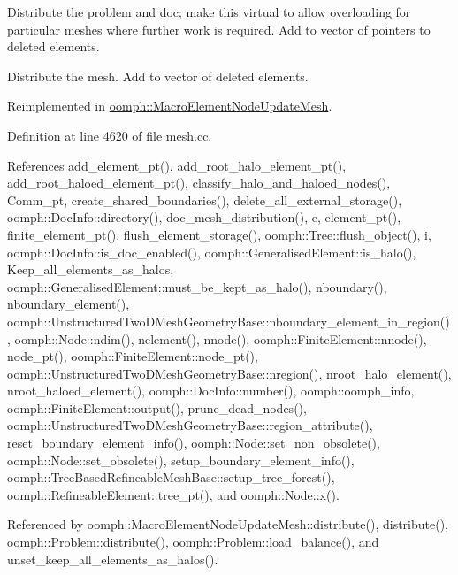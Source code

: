 Distribute the problem and doc; make this virtual to allow overloading for particular meshes where further work is required. Add to vector of pointers to deleted elements. 

Distribute the mesh. Add to vector of deleted elements. 

Reimplemented in \hyperlink{classoomph_1_1MacroElementNodeUpdateMesh_ab3712092128e5f47dc664603b0b1776f}{oomph\+::\+Macro\+Element\+Node\+Update\+Mesh}.



Definition at line 4620 of file mesh.\+cc.



References add\+\_\+element\+\_\+pt(), add\+\_\+root\+\_\+halo\+\_\+element\+\_\+pt(), add\+\_\+root\+\_\+haloed\+\_\+element\+\_\+pt(), classify\+\_\+halo\+\_\+and\+\_\+haloed\+\_\+nodes(), Comm\+\_\+pt, create\+\_\+shared\+\_\+boundaries(), delete\+\_\+all\+\_\+external\+\_\+storage(), oomph\+::\+Doc\+Info\+::directory(), doc\+\_\+mesh\+\_\+distribution(), e, element\+\_\+pt(), finite\+\_\+element\+\_\+pt(), flush\+\_\+element\+\_\+storage(), oomph\+::\+Tree\+::flush\+\_\+object(), i, oomph\+::\+Doc\+Info\+::is\+\_\+doc\+\_\+enabled(), oomph\+::\+Generalised\+Element\+::is\+\_\+halo(), Keep\+\_\+all\+\_\+elements\+\_\+as\+\_\+halos, oomph\+::\+Generalised\+Element\+::must\+\_\+be\+\_\+kept\+\_\+as\+\_\+halo(), nboundary(), nboundary\+\_\+element(), oomph\+::\+Unstructured\+Two\+D\+Mesh\+Geometry\+Base\+::nboundary\+\_\+element\+\_\+in\+\_\+region(), oomph\+::\+Node\+::ndim(), nelement(), nnode(), oomph\+::\+Finite\+Element\+::nnode(), node\+\_\+pt(), oomph\+::\+Finite\+Element\+::node\+\_\+pt(), oomph\+::\+Unstructured\+Two\+D\+Mesh\+Geometry\+Base\+::nregion(), nroot\+\_\+halo\+\_\+element(), nroot\+\_\+haloed\+\_\+element(), oomph\+::\+Doc\+Info\+::number(), oomph\+::oomph\+\_\+info, oomph\+::\+Finite\+Element\+::output(), prune\+\_\+dead\+\_\+nodes(), oomph\+::\+Unstructured\+Two\+D\+Mesh\+Geometry\+Base\+::region\+\_\+attribute(), reset\+\_\+boundary\+\_\+element\+\_\+info(), oomph\+::\+Node\+::set\+\_\+non\+\_\+obsolete(), oomph\+::\+Node\+::set\+\_\+obsolete(), setup\+\_\+boundary\+\_\+element\+\_\+info(), oomph\+::\+Tree\+Based\+Refineable\+Mesh\+Base\+::setup\+\_\+tree\+\_\+forest(), oomph\+::\+Refineable\+Element\+::tree\+\_\+pt(), and oomph\+::\+Node\+::x().



Referenced by oomph\+::\+Macro\+Element\+Node\+Update\+Mesh\+::distribute(), distribute(), oomph\+::\+Problem\+::distribute(), oomph\+::\+Problem\+::load\+\_\+balance(), and unset\+\_\+keep\+\_\+all\+\_\+elements\+\_\+as\+\_\+halos().

